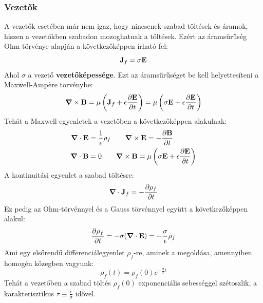 \documentclass[a4paper,12pt]{article}
\begin{document}
\subsubsection*{Vezetők}
A vezetők esetében már nem igaz, hogy nincsenek szabad töltések és áramok, hiszen a vezetőkben szabadon mozoghatnak a töltések. Ezért az áramsűrűség Ohm törvénye alapján a következőképpen írható fel:
\begin{equation}
    \bold{J}_f = \sigma \bold{E}
\end{equation}
Ahol $\sigma$ a vezető \textbf{vezetőképessége}. Ezt az áramsűrűséget be kell helyettesíteni a Maxwell-Ampère törvénybe:
\begin{equation}
    \boldsymbol{\nabla} \times \bold{B} = \mu \left( \bold{J}_f + \epsilon \frac{\partial \bold{E}}{\partial t} \right) = \mu \left( \sigma \bold{E} + \epsilon \frac{\partial \bold{E}}{\partial t} \right)
\end{equation}
Tehát a Maxwell-egyenletek a vezetőben a következőképpen alakulnak:
\begin{equation}
    \begin{aligned}
        \boldsymbol{\nabla} \cdot \bold{E} &= \frac{1}{\epsilon} \rho_f \qquad \boldsymbol{\nabla} \times \bold{E} = -\frac{\partial \bold{B}}{\partial t} \\
        \boldsymbol{\nabla} \cdot \bold{B} &= 0 \qquad \boldsymbol{\nabla} \times \bold{B} = \mu \left( \sigma \bold{E} + \epsilon \frac{\partial \bold{E}}{\partial t} \right)
    \end{aligned}
\end{equation}
A kontinuitási egyenlet a szabad töltésre:
\begin{equation}
    \boldsymbol{\nabla} \cdot \bold{J}_f = - \frac{\partial \rho_f}{\partial t}
\end{equation}
Ez pedig az Ohm-törvénnyel és a Gauss törvénnyel együtt a következőképpen alakul:
\begin{equation}
    \frac{\partial \rho_f}{\partial t} = -\sigma (\boldsymbol{\nabla} \cdot \bold{E}) = - \frac{\sigma}{\epsilon} \rho_f
\end{equation}
Ami egy elsőrendű differenciálegyenlet $\rho_f$-re, aminek a megoldása, amennyiben homogén közegben vagyunk:
\begin{equation}
    \rho_f(t) = \rho_f(0) e^{-\frac{\sigma}{\epsilon} t}
\end{equation}
Tehát a vezetőben a szabad töltés $\rho_f(0)$ exponenciális sebességgel szétoszlik, a karakterisztikus $\tau \equiv \frac{\epsilon}{\sigma}$ idővel.
\end{document}
